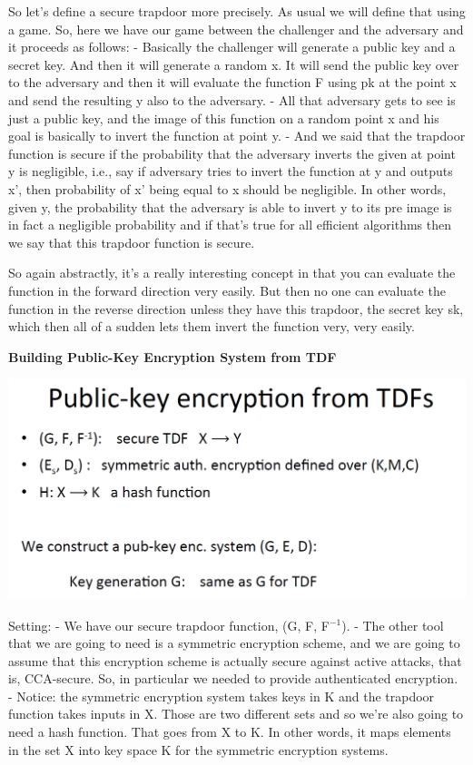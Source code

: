 \documentclass[11pt]{article}
\makeatletter
\def\maxwidth{\ifdim\Gin@nat@width>\linewidth\linewidth
    \else\Gin@nat@width\fi}
\let\Oldincludegraphics\includegraphics
\renewcommand{\includegraphics}[1]{\Oldincludegraphics[width=.8\maxwidth]{#1}}
\makeatother
\begin{document}
So let's define a secure trapdoor more precisely. As usual we will
define that using a game. So, here we have our game between the
challenger and the adversary and it proceeds as follows: - Basically the
challenger will generate a public key and a secret key. And then it will
generate a random x. It will send the public key over to the adversary
and then it will evaluate the function F using pk at the point x and
send the resulting y also to the adversary. - All that adversary gets to
see is just a public key, and the image of this function on a random
point x and his goal is basically to invert the function at point y. -
And we said that the trapdoor function is secure if the probability that
the adversary inverts the given at point y is negligible, i.e., say if
adversary tries to invert the function at y and outputs x', then
probability of x' being equal to x should be negligible. In other words,
given y, the probability that the adversary is able to invert y to its
pre image is in fact a negligible probability and if that's true for all
efficient algorithms then we say that this trapdoor function is secure.

So again abstractly, it's a really interesting concept in that you can
evaluate the function in the forward direction very easily. But then no
one can evaluate the function in the reverse direction unless they have
this trapdoor, the secret key sk, which then all of a sudden lets them
invert the function very, very easily.

\textbf{Building Public-Key Encryption System from TDF}

\includegraphics{./Images/PKEncFromTDF-1.png}

Setting: - We have our secure trapdoor function, (G, F, F\(^{-1}\)). -
The other tool that we are going to need is a symmetric encryption
scheme, and we are going to assume that this encryption scheme is
actually secure against active attacks, that is, CCA-secure. So, in
particular we needed to provide authenticated encryption. - Notice: the
symmetric encryption system takes keys in K and the trapdoor function
takes inputs in X. Those are two different sets and so we're also going
to need a hash function. That goes from X to K. In other words, it maps
elements in the set X into key space K for the symmetric encryption
systems.
\end{document}
